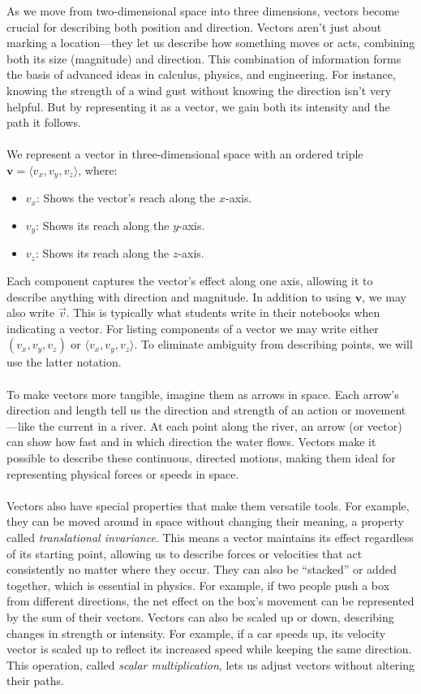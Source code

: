 \noindent As we move from two-dimensional space into three dimensions, vectors become crucial for describing both position and direction. Vectors aren’t just about marking a location—they let us describe how something moves or acts, combining both its size (magnitude) and direction. This combination of information forms the basis of advanced ideas in calculus, physics, and engineering. For instance, knowing the strength of a wind gust without knowing the direction isn’t very helpful. But by representing it as a vector, we gain both its intensity and the path it follows. \\ \\ We represent a vector in three-dimensional space with an ordered triple \( \mathbf{v} =\langle v_x, v_y, v_z \rangle \), where:
\begin{itemize}
    \item \( v_x \): Shows the vector’s reach along the \( x \)-axis.
    \item \( v_y \): Shows its reach along the \( y \)-axis.
    \item \( v_z \): Shows its reach along the \( z \)-axis.
\end{itemize}

\noindent Each component captures the vector’s effect along one axis, allowing it to describe anything with direction and magnitude. In addition to using \( \mathbf{v}\), we may also write \( \vec{v} \). This is typically what students write in their notebooks when indicating a vector. For listing components of a vector we may write either \( (v_x, v_y, v_z) \) or \( \langle v_x, v_y, v_z \rangle \). To eliminate ambiguity from describing points, we will use the latter notation. \\ \\ To make vectors more tangible, imagine them as arrows in space. Each arrow’s direction and length tell us the direction and strength of an action or movement—like the current in a river. At each point along the river, an arrow (or vector) can show how fast and in which direction the water flows. Vectors make it possible to describe these continuous, directed motions, making them ideal for representing physical forces or speeds in space. \\ \\ Vectors also have special properties that make them versatile tools. For example, they can be moved around in space without changing their meaning, a property called \textit{translational invariance}. This means a vector maintains its effect regardless of its starting point, allowing us to describe forces or velocities that act consistently no matter where they occur. They can also be ``stacked” or added together, which is essential in physics. For example, if two people push a box from different directions, the net effect on the box’s movement can be represented by the sum of their vectors. Vectors can also be scaled up or down, describing changes in strength or intensity. For example, if a car speeds up, its velocity vector is scaled up to reflect its increased speed while keeping the same direction. This operation, called \textit{scalar multiplication}, lets us adjust vectors without altering their paths.

